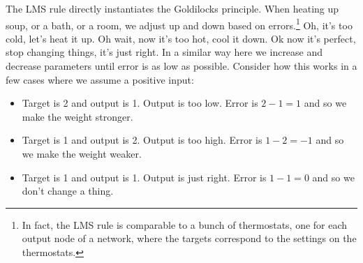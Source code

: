 
The LMS rule directly instantiates the Goldilocks principle. When heating up soup, or a bath, or a room, we adjust up and down based on errors.\footnote{In fact, the LMS rule is comparable to a bunch of thermostats, one for each output node of a network, where the targets correspond to the settings on the thermostats.} Oh, it's too cold, let's heat it up. Oh wait, now it's too hot, cool it down. Ok now it's perfect, stop changing things, it's just right. In a similar way here we increase and decrease parameters until error is as low as possible. Consider how this works in a few cases where we assume a positive input:
\begin{itemize}
\item Target is 2 and output is 1. Output is too low. Error is $2-1 = 1$ and so we make the weight stronger.
\item Target is 1 and output is 2. Output is too high. Error is $1-2 = -1$ and so we make the weight weaker.
\item Target is 1 and output is 1. Output is just right. Error is $1-1 = 0$ and so we don't change a thing.
\end{itemize}


%

